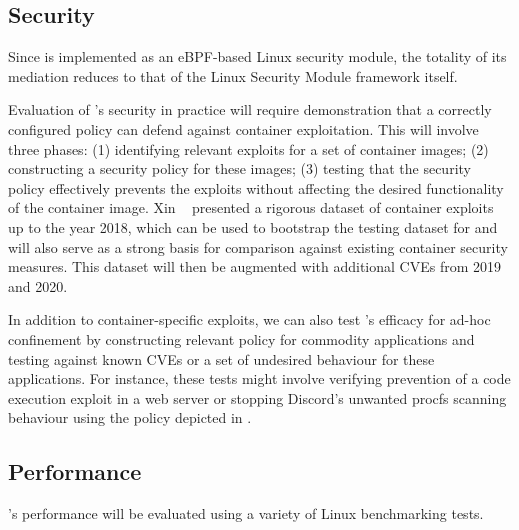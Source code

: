 \subsection{Security}


Since \bpfcontain{} is implemented as an eBPF-based Linux security module, the totality of its mediation reduces to that of the Linux Security Module framework itself. 

Evaluation of \bpfcontain{}'s security in practice will require demonstration that a correctly configured \bpfcontain{} policy can defend against container exploitation. This will involve three phases: (1) identifying relevant exploits for a set of container images; (2) constructing a security policy for these images; (3) testing that the security policy effectively prevents the exploits without affecting the desired functionality of the container image. Xin \etal~\cite{xin2018_container_security} presented a rigorous dataset of container exploits up to the year 2018, which can be used to bootstrap the testing dataset for \bpfcontain{} and will also serve as a strong basis for comparison against existing container security measures. This dataset will then be augmented with additional CVEs from 2019 and 2020.

In addition to container-specific exploits, we can also test \bpfcontain{}'s efficacy for ad-hoc confinement by constructing relevant \bpfcontain{} policy for commodity applications and testing against known CVEs or a set of undesired behaviour for these applications. For instance, these tests might involve verifying prevention of a code execution exploit in a web server or stopping Discord's unwanted procfs scanning behaviour using the policy depicted in .

\subsection{Performance}

\bpfcontain{}'s performance will be evaluated using a variety of Linux benchmarking tests.

